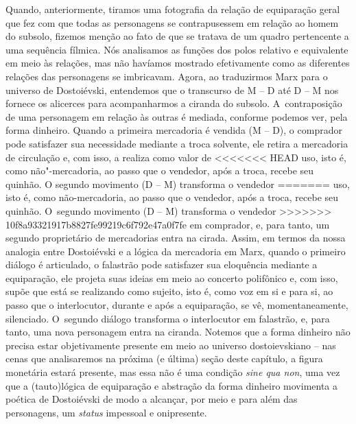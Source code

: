 {Quando, anteriormente, tiramos uma fotografia da relação de equiparação
geral que fez com que todas as personagens se contrapusessem em relação
ao homem do subsolo, fizemos menção ao fato de que se tratava de um
quadro pertencente a uma sequência fílmica. Nós analisamos as funções
dos polos relativo e equivalente em meio às relações, mas não havíamos
mostrado efetivamente como as diferentes relações das personagens se
imbricavam. Agora, ao traduzirmos Marx para o universo de Dostoiévski,
entendemos que o transcurso de M -- D até D -- M nos fornece os
alicerces para acompanharmos a ciranda do subsolo. A~contraposição de
uma personagem em relação às outras é mediada, conforme podemos ver,
pela forma dinheiro. Quando a primeira mercadoria é vendida (M -- D), o
comprador pode satisfazer sua necessidade mediante a troca solvente, ele
retira a mercadoria de circulação e, com isso, a realiza como valor de
<<<<<<< HEAD
uso, isto é, como não"-mercadoria, ao passo que o vendedor, após a troca,
recebe seu quinhão. O segundo movimento (D -- M) transforma o vendedor
=======
uso, isto é, como não-mercadoria, ao passo que o vendedor, após a troca,
recebe seu quinhão. O~segundo movimento (D -- M) transforma o vendedor
>>>>>>> 10f8a93321917b8827fe99219c6f792e47a0f7fe
em comprador, e, para tanto, um segundo proprietário de mercadorias
entra na cirada. Assim, em termos da nossa analogia entre Dostoiévski e
a lógica da mercadoria em Marx, quando o primeiro diálogo é articulado,
o falastrão pode satisfazer sua eloquência mediante a equiparação, ele
projeta suas ideias em meio ao concerto polifônico e, com isso, supõe
que está se realizando como sujeito, isto é, como voz em si e para si,
ao passo que o interlocutor, durante e após a equiparação, se vê,
momentaneamente, silenciado. O~segundo diálogo transforma o interlocutor
em falastrão, e, para tanto, uma nova personagem entra na ciranda.
Notemos que a forma dinheiro não precisa estar objetivamente presente em
meio ao universo dostoievskiano -- nas cenas que analisaremos na próxima
(e última) seção deste capítulo, a figura monetária estará presente, mas
essa não é uma condição \emph{sine qua non}, uma vez que a (tauto)lógica
de equiparação e abstração da forma dinheiro movimenta a poética de
Dostoiévski de modo a alcançar, por meio e para além das personagens, um
\emph{status} impessoal e onipresente.

}
